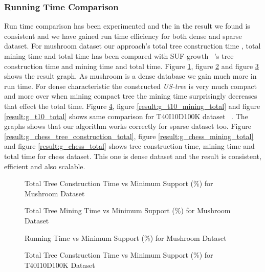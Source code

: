 	\subsubsection{Running Time Comparison}
	Run time comparison has been experimented and the in the result we found is consistent and we have gained run time efficiency for both dense and sparse dataset. For mushroom dataset our approach's total tree construction time , total mining time and total time has been compared with SUF-growth ~\cite{suf_growth}'s tree construction time and mining time and total time. Figure \ref{result:g_m_tree_construction_total}, figure \ref{result:g_m_mining_total} and figure \ref{result:g_m_total} shows the result graph. As mushroom is a dense database we gain much more in run time. For dense characteristic the constructed \emph{US-tree} is very much compact and more over when mining compact tree the mining time surprisingly decreases that effect the total time. Figure \ref{result:g_t10_tree_construction_total}, figure \ref{result:g_t10_mining_total} and figure \ref{result:g_t10_total} shows same comparison for T40I10D100K dataset ~\cite{dataset}. The graphs shows that our algorithm works correctly for sparse dataset too. Figure \ref{result:g_chess_tree_construction_total}, figure \ref{result:g_chess_mining_total} and figure \ref{result:g_chess_total} shows tree construction time, mining time and total time for chess dataset. This one is dense dataset and the result is consistent, efficient and also scalable.
			\begin{figure}[h]
			\centering
				
			\caption{Total Tree Construction Time vs Minimum Support (\%) for Mushroom Dataset ~\cite{dataset}}
			\label{result:g_m_tree_construction_total}
			\end{figure}
			
			\begin{figure}[h]
			\centering
				
			\caption{Total Tree Mining Time vs Minimum Support (\%) for Mushroom Dataset ~\cite{dataset}}
			\label{result:g_m_mining_total}
			\end{figure}
			\begin{figure}[h]
			\centering
				
			\caption{Running Time vs Minimum Support (\%) for Mushroom Dataset ~\cite{dataset}}
			\label{result:g_m_total}
			\end{figure}
			\begin{figure}[h]
			\centering
				
			\caption{Total Tree Construction Time vs Minimum Support (\%) for T40I10D100K Dataset ~\cite{dataset}}
			\label{result:g_t10_tree_construction_total}
			\end{figure}
			
